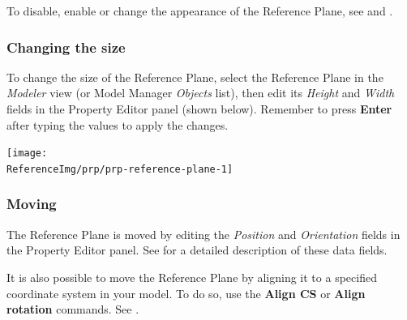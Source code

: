 To disable, enable or change the appearance of the Reference Plane, see
 and
.

\subsubsection{Changing the size}

To change the size of the Reference Plane, select the Reference Plane in the
{\sl Modeler} view (or Model Manager {\sl Objects} list), then edit its
{\sl Height} and {\sl Width} fields in the Property Editor panel (shown below).
Remember to press \textbf{Enter} after typing the values to apply the changes.

\noindent
\texttt{[image: \\ReferenceImg/prp/prp-reference-plane-1]}

\subsubsection{Moving}

The Reference Plane is moved by editing the {\sl Position} and {\sl Orientation}
fields in the Property Editor panel.
See 
for a detailed description of these data fields.

It is also possible to move the Reference Plane by aligning it to a specified
coordinate system in your model.
To do so, use the \textbf{Align CS} or \textbf{Align rotation} commands.
See .



